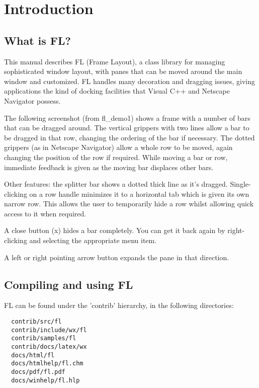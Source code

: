 \chapter{Introduction}\label{introduction}
%
%
\setfooter{\thepage}{}{}{}{}{\thepage}%

\section{What is FL?}\label{whatisfl}

This manual describes FL (Frame Layout), a
class library for managing sophisticated window layout,
with panes that can be moved around the main window
and customized. FL handles many decoration and dragging
issues, giving applications the kind of docking facilities
that Visual C++ and Netscape Navigator possess.

The following screenshot (from fl\_demo1) shows a frame with a number of
bars that can be dragged around. The vertical grippers with
two lines allow a bar to be dragged in that row, changing the
ordering of the bar if necessary.
The dotted grippers (as in Netscape Navigator) allow
a whole row to be moved, again changing the position of the row
if required. While moving a bar or row, immediate feedback
is given as the moving bar displaces other bars.

Other features: the splitter bar shows a dotted thick line as
it's dragged. Single-clicking on a row handle minimizes it to
a horizontal tab which is given its own narrow row. This allows
the user to temporarily hide a row whilst allowing quick access
to it when required.

A close button (x) hides a bar completely. You can get it back again
by right-clicking and selecting the appropriate menu item.

A left or right pointing arrow button expands the pane in that direction.


\section{Compiling and using FL}

FL can be found under the 'contrib' hierarchy, in the following directories:

\begin{verbatim}
  contrib/src/fl
  contrib/include/wx/fl
  contrib/samples/fl
  contrib/docs/latex/wx
  docs/html/fl
  docs/htmlhelp/fl.chm
  docs/pdf/fl.pdf
  docs/winhelp/fl.hlp
\end{verbatim}


